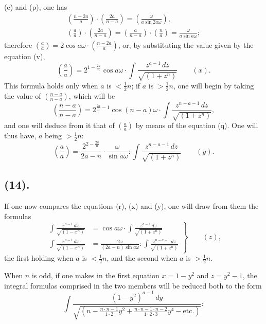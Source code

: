 \documentclass{article}
\begin{document}
(e) and (p), one has
\[ \begin{gathered} \left(\frac{n-2a}{a}\right)\cdot\left(\frac{2a}{n-a}\right)=\left(\frac{\omega}{a\sin 2a\omega}\right),\\ \left(\frac{a}{a}\right)\cdot\left(\frac{2a}{n-a}\right)=\left(\frac{a}{n-a}\right)\cdot\left(\frac{n}{a}\right)=\frac{\omega}{a\sin a\omega}; \end{gathered} \]
therefore $\left(\frac{a}{a}\right)=2\cos a\omega\cdot\left(\frac{n-2a}{a}\right)$, or, by substituting the value given by the equation (v),
\[ \left(\frac{a}{a}\right)=2^{1-\frac{2a}{n}}\cos a\omega\cdot\int\frac{z^{a-1}\,dz}{\sqrt{(1+z^{n})}}\qquad(x). \]
This formula holds only when $a$ is $<\frac{1}{2}n$; if $a$ is $>\frac{1}{2}n$, one will begin by taking the value of $\left(\frac{n-a}{n-a}\right)$, which will be
\[ \left(\frac{n-a}{n-a}\right)=2^{\frac{2a}{n}-1}\cos(n-a)\omega\cdot\int\frac{z^{n-a-1}\,dz}{\sqrt{(1+z^{n})}}, \]
and one will deduce from it that of $\left(\frac{a}{a}\right)$ by means of the equation (q). One will thus have, $a$ being $>\frac{1}{2}n$:
\[ \left(\frac{a}{a}\right)=\frac{2^{2-\frac{2a}{n}}}{2a-n}\cdot\frac{\omega}{\sin a\omega}:\int\frac{z^{n-a-1}\,dz}{\sqrt{(1+z^{n})}}\qquad(y). \]

\subsection*{(14).}

If one now compares the equations (r), (x) and (y), one will draw from them the formulas
\[ \left.\begin{aligned} \int\frac{x^{a-1}\,dx}{\sqrt{(1-x^{n})}}&=\cos a\omega\cdot\int\frac{z^{a-1}\,dz}{\sqrt{(1+z^{n})}}\\ \int\frac{x^{a-1}\,dx}{\sqrt{(1-x^{n})}}&=\frac{2\omega}{(2a-n)\sin a\omega}:\int\frac{z^{n-a-1}\,dz}{\sqrt{(1+z^{n})}} \end{aligned}\right\}\qquad(z), \]
the first holding when $a$ is $<\frac{1}{2}n$, and the second when $a$ is $>\frac{1}{2}n$.

When $n$ is odd, if one makes in the first equation $x=1-y^{2}$ and $z=y^{2}-1$, the integral formulas comprised in the two members will be reduced both to the form
\[ \int\frac{(1-y^{2})^{a-1}\,dy}{\sqrt{\left(n-\frac{n\cdot n-1}{1\cdot 2}y^{2}+\frac{n\cdot n-1\cdot n-2}{1\cdot 2\cdot 3}y^{4}-\text{etc.}\right)}}: \]
\end{document}
